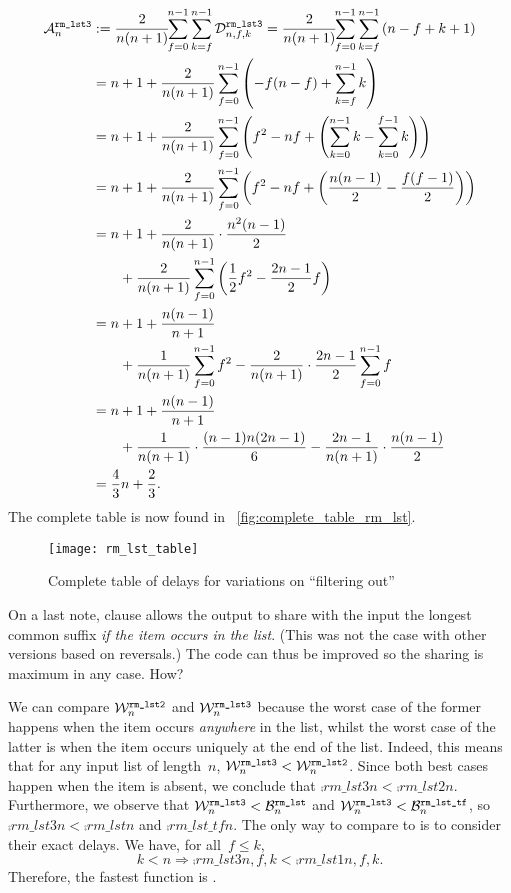 \begin{align*}
\ave{rm\_lst3}{n} 
  &:=
   \frac{2}{n(n+1)}\!\!\sum_{f=0}^{n-1}\sum_{k=f}^{n-1}{\comp{rm\_lst3}{n,f,k}}
   = \frac{2}{n(n+1)}\!\!\sum_{f=0}^{n-1}\sum_{k=f}^{n-1}{(n-f+k+1)}\\
  &= n + 1 + \frac{2}{n(n+1)}\sum_{f=0}^{n-1}\left(-f(n-f) +
   \sum_{k=f}^{n-1}{k}\right)\\
  &= n + 1 
     + \frac{2}{n(n+1)}\sum_{f=0}^{n-1}\left(f^2-nf+
         \left(\sum_{k=0}^{n-1}{k} -
         \sum_{k=0}^{f-1}{k}\right)\right)\\
  &= n + 1 
     + \frac{2}{n(n+1)}\sum_{f=0}^{n-1}\left(f^2 -nf + 
       \left(\frac{n(n-1)}{2} - \frac{f(f-1)}{2}\right)\right)\\
  &= n + 1 + \frac{2}{n(n+1)} \cdot \frac{n^2(n-1)}{2}\\
  &\phantom{= n\;}
     + \frac{2}{n(n+1)}\sum_{f=0}^{n-1}{\left(\frac{1}{2}{f^2} -
       \frac{2n-1}{2}{f}\right)}\\
  &= n + 1 + \frac{n(n-1)}{n+1}\\
  &\phantom{= n\;}
     + \frac{1}{n(n+1)}\sum_{f=0}^{n-1}{f^2}
     - \frac{2}{n(n+1)} \cdot \frac{2n-1}{2}\sum_{f=0}^{n-1}{f}\\
  &= n + 1 + \frac{n(n-1)}{n+1}\\
  &\phantom{= n\;}
     + \frac{1}{n(n+1)} \cdot \frac{(n-1)n(2n-1)}{6}
     - \frac{2n-1}{n(n+1)} \cdot \frac{n(n-1)}{2}\\
  &= \frac{4}{3}{n} + \frac{2}{3}.
\end{align*}
The complete table is now found in
\fig~\vref{fig:complete_table_rm_lst}.
\begin{figure}[b]
\centering
\texttt{[image: rm\_lst\_table]}
\caption{Complete table of delays for variations on ``filtering out''
\label{fig:complete_table_rm_lst}}
\end{figure}
On a last note, clause \clause{\delta} allows the output to share with
the input the longest common suffix \emph{if the item occurs in the
  list}. (This was not the case with other versions based on
reversals.) The code can thus be improved so the sharing is maximum in
any case. How?

\smallskip

\noindent We can compare \(\worst{rm\_lst2}{n}\) and
\(\worst{rm\_lst3}{n}\) because the worst case of the former happens
when the item occurs \emph{anywhere} in the list, whilst the worst
case of the latter is when the item occurs uniquely at the end of the
list. Indeed, this means that for any input list of length~\(n\),
\(\worst{rm\_lst3}{n} < \worst{rm\_lst2}{n}\). Since both best cases
happen when the item is absent, we conclude that \(\comp{rm\_lst3}{n}
< \comp{rm\_lst2}{n}\). Furthermore, we observe that
\(\worst{rm\_lst3}{n} < \best{rm\_lst}{n}\) and \(\worst{rm\_lst3}{n}
< \best{rm\_lst\_tf}{n}\), so \(\comp{rm\_lst3}{n} <
\comp{rm\_lst}{n}\) and \(\comp{rm\_lst\_tf}{n}\). The only way to
compare  to  is to consider
their exact delays. We have, for all~\({f \leqslant k}\),
\[
k < n \Rightarrow \comp{rm\_lst3}{n,f,k} < \comp{rm\_lst1}{n,f,k}.
\]
Therefore, the fastest function is .

